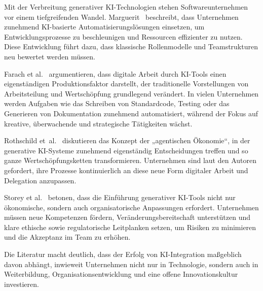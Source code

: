Mit der Verbreitung generativer KI-Technologien stehen Softwareunternehmen vor
einem tiefgreifenden Wandel. Marguerit~\cite{marguerit_augmenting_2025}
beschreibt, dass Unternehmen zunehmend KI-basierte Automatisierungslösungen
einsetzen, um Entwicklungsprozesse zu beschleunigen und Ressourcen effizienter
zu nutzen. Diese Entwicklung führt dazu, dass klassische Rollenmodelle und
Teamstrukturen neu bewertet werden müssen.

Farach et al.~\cite{farach_evolving_2025} argumentieren, dass digitale Arbeit
durch KI-Tools einen eigenständigen Produktionsfaktor darstellt, der
traditionelle Vorstellungen von Arbeitsteilung und Wertschöpfung grundlegend
verändert. In vielen Unternehmen werden Aufgaben wie das Schreiben von
Standardcode, Testing oder das Generieren von Dokumentation zunehmend
automatisiert, während der Fokus auf kreative, überwachende und strategische
Tätigkeiten wächst.

Rothschild et~al.~\cite{rothschild_agentic_2025} diskutieren das Konzept der
„agentischen Ökonomie“, in der generative KI-Systeme zunehmend eigenständig
Entscheidungen treffen und so ganze Wertschöpfungsketten transformieren.
Unternehmen sind laut den Autoren gefordert, ihre Prozesse kontinuierlich an
diese neue Form digitaler Arbeit und Delegation anzupassen.

Storey et al.~\cite{storey_generative_2025} betonen, dass die Einführung
generativer KI-Tools nicht nur ökonomische, sondern auch organisatorische
Anpassungen erfordert. Unternehmen müssen neue Kompetenzen fördern,
Veränderungsbereitschaft unterstützen und klare ethische sowie regulatorische
Leitplanken setzen, um Risiken zu minimieren und die Akzeptanz im Team zu
erhöhen.

Die Literatur macht deutlich, dass der Erfolg von KI-Integration maßgeblich
davon abhängt, inwieweit Unternehmen nicht nur in Technologie, sondern auch in
Weiterbildung, Organisationsentwicklung und eine offene Innovationskultur
investieren.

